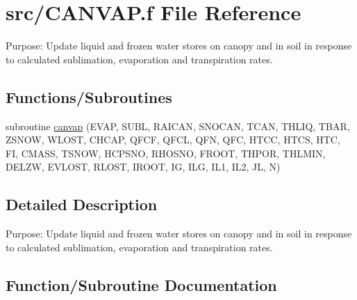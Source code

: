 \hypertarget{CANVAP_8f}{}\section{src/\+C\+A\+N\+V\+A\+P.f File Reference}
\label{CANVAP_8f}


Purpose\+: Update liquid and frozen water stores on canopy and in soil in response to calculated sublimation, evaporation and transpiration rates.  


\subsection*{Functions/\+Subroutines}
\begin{DoxyCompactItemize}
\item 
subroutine \hyperlink{CANVAP_8f_a3041cf9c21766306cba0e7bc1b00161f}{canvap} (E\+V\+A\+P, S\+U\+B\+L, R\+A\+I\+C\+A\+N, S\+N\+O\+C\+A\+N, T\+C\+A\+N, T\+H\+L\+I\+Q, T\+B\+A\+R, Z\+S\+N\+O\+W, W\+L\+O\+S\+T, C\+H\+C\+A\+P, Q\+F\+C\+F, Q\+F\+C\+L, Q\+F\+N, Q\+F\+C, H\+T\+C\+C, H\+T\+C\+S, H\+T\+C, F\+I, C\+M\+A\+S\+S, T\+S\+N\+O\+W, H\+C\+P\+S\+N\+O, R\+H\+O\+S\+N\+O, F\+R\+O\+O\+T, T\+H\+P\+O\+R, T\+H\+L\+M\+I\+N, D\+E\+L\+Z\+W, E\+V\+L\+O\+S\+T, R\+L\+O\+S\+T, I\+R\+O\+O\+T, I\+G, I\+L\+G, I\+L1, I\+L2, J\+L, N)
\end{DoxyCompactItemize}


\subsection{Detailed Description}
Purpose\+: Update liquid and frozen water stores on canopy and in soil in response to calculated sublimation, evaporation and transpiration rates. 



\subsection{Function/\+Subroutine Documentation}
\hypertarget{CANVAP_8f_a3041cf9c21766306cba0e7bc1b00161f}{}
